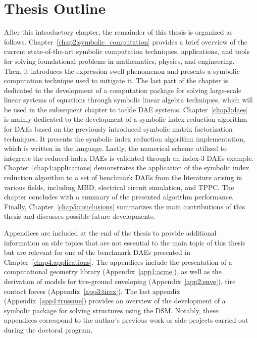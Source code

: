 \section{Thesis Outline}

After this introductory chapter, the remainder of this thesis is organized as follows. Chapter~\ref{chap2:symbolic_computation} provides a brief overview of the current state-of-the-art symbolic computation techniques, applications, and tools for solving foundational problems in mathematics, physics, and engineering. Then, it introduces the expression swell phenomenon and presents a symbolic computation technique used to mitigate it. The last part of the chapter is dedicated to the development of a computation package for solving large-scale linear systems of equations through symbolic linear algebra techniques, which will be used in the subsequent chapter to tackle \ac{DAE} systems. Chapter~\ref{chap3:daes} is mainly dedicated to the development of a symbolic index reduction algorithm for \acp{DAE} based on the previously introduced symbolic matrix factorization techniques. It presents the symbolic index reduction algorithm implementation, which is written in the \Maple{} language. Lastly, the numerical scheme utilized to integrate the reduced-index \acp{DAE} is validated through an index-3 \acp{DAE} example. Chapter~\ref{chap4:applications} demonstrates the application of the symbolic index reduction algorithm to a set of benchmark \acp{DAE} from the literature arising in various fields, including \ac{MBD}, electrical circuit simulation, and \ac{TPPC}. The chapter concludes with a summary of the presented algorithm performance. Finally, Chapter~\ref{chap5:conclusions} summarizes the main contributions of this thesis and discusses possible future developments.

Appendices are included at the end of the thesis to provide additional information on side topics that are not essential to the main topic of this thesis but are relevant for one of the benchmark \acp{DAE} presented in Chapter~\ref{chap4:applications}. The appendices include the presentation of a \cpp{} computational geometry library (Appendix~\ref{app1:acme}), as well as the derivation of models for tire-ground enveloping (Appendix~\ref{app2:enve}), tire contact forces (Appendix~\ref{app3:tirex}). The last appendix (Appendix~\ref{app4:trussme}) provides an overview of the development of a symbolic package for solving structures using the \ac{DSM}. Notably, these appendices correspond to the author's previous work or side projects carried out during the doctoral program.


